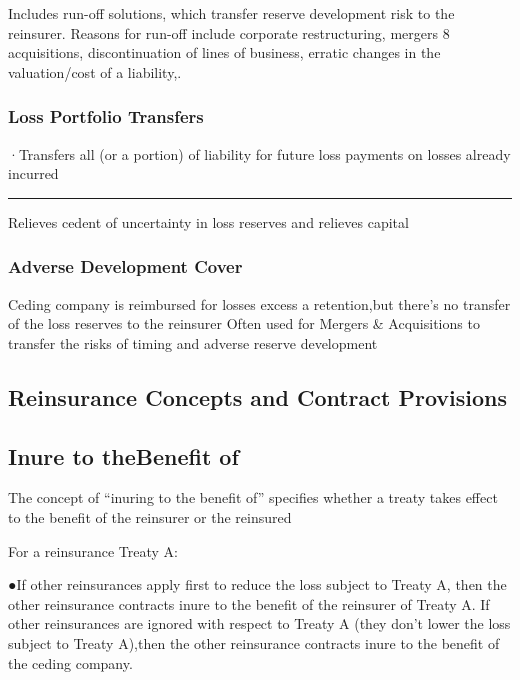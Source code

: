 \documentclass[
]{article}
\begin{document}
Includes run-off solutions, which transfer reserve development risk to
the reinsurer. Reasons for run-off include corporate restructuring,
mergers 8 acquisitions, discontinuation of lines of business, erratic
changes in the valuation/cost of a liability,.

\subsubsection{Loss Portfolio Transfers}\label{loss-portfolio-transfers}

·Transfers all (or a portion) of liability for future loss payments on
losses already incurred

\begin{center}\rule{0.5\linewidth}{0.5pt}\end{center}

Relieves cedent of uncertainty in loss reserves and relieves capital

\subsubsection{Adverse Development
Cover}\label{adverse-development-cover}

Ceding company is reimbursed for losses excess a retention,but there's
no transfer of the loss reserves to the reinsurer Often used for Mergers
\& Acquisitions to transfer the risks of timing and adverse reserve
development

\subsection{Reinsurance Concepts and Contract
Provisions}\label{reinsurance-concepts-and-contract-provisions}

\subsection{Inure to theBenefit of}\label{inure-to-thebenefit-of}

The concept of ``inuring to the benefit of'' specifies whether a treaty
takes effect to the benefit of the reinsurer or the reinsured

For a reinsurance Treaty A:

●If other reinsurances apply first to reduce the loss subject to Treaty
A, then the other reinsurance contracts inure to the benefit of the
reinsurer of Treaty A. If other reinsurances are ignored with respect to
Treaty A (they don't lower the loss subject to Treaty A),then the other
reinsurance contracts inure to the benefit of the ceding company.
\end{document}
